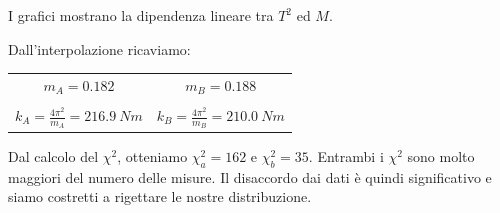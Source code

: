 I grafici mostrano la dipendenza lineare tra $T^2$ ed $M$.


Dall'interpolazione ricaviamo:
\begin{center}
\begin{tabular}{c c}
$m_A=0.182$ & \hspace{3cm} $m_B=0.188$\\ 
\\
$k_A=\displaystyle{\frac{4\pi^2}{m_A}}=216.9\ Nm$ & \hspace{3cm} $k_B=\displaystyle{\frac{4\pi^2}{m_B}}=210.0\ Nm$ \\
\end{tabular}

\end{center}

Dal calcolo del $\chi^2$, otteniamo  $\chi^2_{a} = 162$ e $\chi^2_{b} = 35$. Entrambi i  $\chi^2$ sono molto maggiori del numero delle misure. Il disaccordo dai dati è quindi significativo e siamo costretti a rigettare le nostre distribuzione. 

